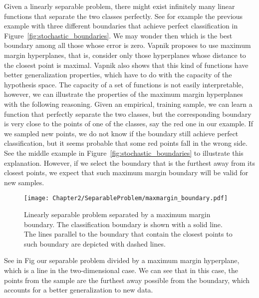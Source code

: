 Given a linearly separable problem, there might exist infinitely many linear functions that separate the two classes perfectly. See for example the previous example with three different boundaries that achieve perfect classification in Figure~\ref{fig:stochastic_boundaries}.
We may wonder then which is the best boundary among all those whose error is zero. Vapnik proposes to use maximum margin hyperplanes, that is, consider only those hyperplanes whose distance to the closest point is maximal.
Vapnik also shows that this kind of functions have better generalization properties, which have to do with the capacity of the hypothesis space.
%
The capacity of a set of functions is not easily interpretable, however, we can illustrate the properties of the maximum margin hyperplanes with the following reasoning. Given an empirical, training sample, we can learn a function that perfectly separate the two classes, but the corresponding boundary is very close to the points of one of the classes, say the red one in our example. If we sampled new points, we do not know if the boundary still achieve perfect classification, but it seems probable that some red points fall in the wrong side. See the middle example in Figure~\ref{fig:stochastic_boundaries} to illustrate this explanation.
%
However, if we select the boundary that is the furthest away from its closest points, we expect that such maximum margin boundary will be valid for new samples.
%
\begin{figure}[t!]
    \centering
    \texttt{[image: Chapter2/SeparableProblem/maxmargin\_boundary.pdf]}
    \caption{Linearly separable problem separated by a maximum margin boundary. The classification boundary is shown with a solid line. The lines parallel to the boundary that contain the closest points to such boundary are depicted with dashed lines.}
    \label{fig:maxmargin_boundary}
\end{figure}
%
See in Fig our separable problem divided by a maximum margin hyperplane, which is a line in the two-dimensional case. We can see that in this case, the points from the sample are the furthest away possible from the boundary, which accounts for a better generalization to new data.

